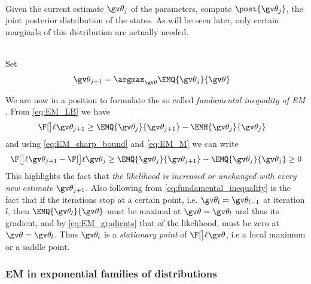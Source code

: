 \begin{description}
\addtolength{\leftskip}{1cm}
  \item[E-step]\hfill\\
  Given the current estimate $\Th_j$ of the parameters, compute	
  $\post{\Th_j}$, the joint posterior distribution of the states. 
  As will be seen later, only certain marginals of this distribution
  are actually needed.  
  \item[M-step]\hfill\\ 
  Set
    \begin{align}
		\Th_{j+1}&=\argmax_{\Th}\EMQ{\Th_j}{\Th} \label{eq:EM_M}
	\end{align}
\end{description}
We are now in a position to formulate the so called \emph{fundamental inequality of EM} \parencite{Cappe2005}.
From \eqref{eq:EM_LB} we have
\begin{align*}
	\lLH[\Th_{j+1}] & \geq \EMQ{\Th_j}{\Th_{j+1}} - \EMH{\Th_j}{\Th_{j}}
\end{align*}
and using \eqref{eq:EM_sharp_bound} and \eqref{eq:EM_M} we can write
\begin{align}
\label{eq:fundamental_inequality}	
\begin{split}	
	\lLH[\Th_{j+1}] - \lLH[\Th_j] & \geq \EMQ{\Th_j}{\Th_{j+1}} - \EMQ{\Th_j}{\Th_{j}} \geq 0\\
\end{split}
\end{align}
This highlights
the fact that \emph{the likelihood is increased or unchanged with every new estimate} $\Th_{j+1}$.
Also following from \eqref{eq:fundamental_inequality} is the fact that if the iterations
stop at a certain point, i.e. $\Th_{l}=\Th_{l-1}$ at iteration $l$, then
$\EMQ{\Th_l}{\Th}$ must be maximal at $\Th=\Th_l$ and thus its gradient, and 
by \eqref{eq:EM_gradients} that of the likelihood, must be zero at $\Th=\Th_l$. Thus
$\Th_l$ is a \emph{stationary point} of $\lLH$, i.e a local maximum or a saddle point.

\subsubsection*{EM in exponential families of distributions}\label{sec:EM_exp}

